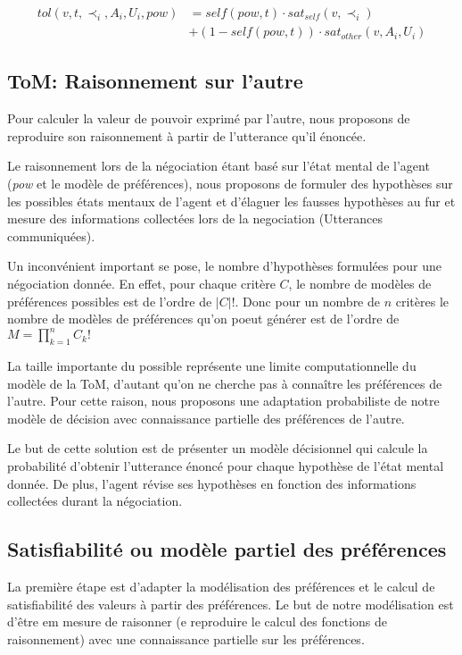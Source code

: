 \documentclass{llncs}
\begin{document}
	\begin{equation}
	\begin{split}
	tol(v, t, \prec_i, A_i, U_i, pow) & = self(pow, t)  \cdot sat_{self}(v, \prec_i) \\
	& +  (1 - self(pow, t)) \cdot sat_{other}(v, A_i, U_i)
	\end{split} 
	\end{equation}
	
	
	\subsection{ToM: Raisonnement sur l'autre}
	
	
	Pour calculer la valeur de pouvoir exprimé par l'autre, nous proposons de reproduire son raisonnement à partir de l'utterance qu'il énoncée.
	
	Le raisonnement lors de la négociation étant basé  sur l'état mental de l'agent (\textit{pow} et le modèle de préférences), nous proposons de formuler des hypothèses sur les possibles états mentaux de l'agent et d'élaguer les fausses hypothèses au fur et mesure des informations collectées lors de la negociation (Utterances communiquées).
	
	Un inconvénient important se pose, le nombre d'hypothèses formulées pour une négociation donnée. En effet, pour chaque critère $C$, le nombre de modèles de préférences possibles est de l'ordre de $|C| !$. Donc pour un nombre de $n$ critères le nombre de modèles de préférences qu'on poeut générer est de l'ordre de $ M = \prod_{k=1}^n C_k!$
	
	La taille importante du possible représente une limite computationnelle du modèle de la ToM, d'autant qu'on ne cherche pas à connaître les préférences de l'autre. Pour cette raison, nous proposons une adaptation probabiliste de notre modèle de décision avec connaissance partielle des préférences de l'autre. 
	
	Le but de cette solution est de présenter un modèle décisionnel qui calcule la probabilité d'obtenir l'utterance énoncé pour chaque hypothèse de l’état mental donnée. De plus, l'agent révise ses hypothèses en fonction des informations collectées durant la négociation.
	
	
	\subsection{Satisfiabilité ou modèle partiel des préférences}
	La première étape est d'adapter la modélisation des préférences et le calcul de satisfiabilité des valeurs à partir des préférences. Le but de notre modélisation est d'être em mesure de raisonner (e reproduire le calcul des fonctions de raisonnement) avec une connaissance partielle sur les préférences. 
	
\end{document}
